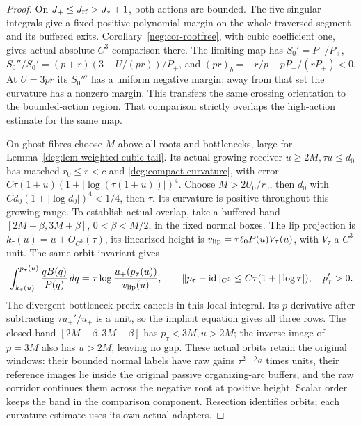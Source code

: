 \begin{proof}
On \(J_+\le J_{\rm rf}>J_*+1\),
both actions are bounded. The five singular integrals give a fixed
positive polynomial margin on the whole traversed segment and its
buffered exits. Corollary~\ref{neg:cor-rootfree}, with cubic coefficient
one, gives actual absolute \(C^3\) comparison there. The limiting map has
\(S_0'=P_-/P_+\),
\(S_0''/S_0'=(p+r)(3-U/(pr))/P_+\), and
\((pr)_b=-r/p-pP_-/(rP_+)<0\).
At \(U=3pr\) its \(S_0'''\) has a uniform negative margin; away
from that set the curvature has a nonzero margin. This transfers the
same crossing orientation to the bounded-action region. That comparison
strictly overlaps the high-action estimate for the same map.

On ghost fibres choose \(M\) above all roots and bottlenecks, large
for Lemma~\ref{deg:lem-weighted-cubic-tail}. Its actual growing
receiver \(u\ge2M,\tau u\le d_0\) has matched \(r_0\le r<c\)
and \eqref{deg:compact-curvature}, with error
\(C\tau(1+u)(1+|\log(\tau(1+u))|)^4\). Choose
\(M>2U_0/r_0\), then \(d_0\) with
\(Cd_0(1+|\log d_0|)^4<1/4\), then \(\tau\). Its curvature is
positive throughout this growing range.
To establish actual overlap, take a buffered band
\([2M-\beta,3M+\beta]\), \(0<\beta<M/2\), in the fixed normal
boxes. The lip projection is \(k_\tau(u)=u+O_{C^3}(\tau)\),
its linearized height is \(v_{\rm lip}=\tau\ell_0P(u)V_\tau(u)\),
with \(V_\tau\) a \(C^3\) unit. The same-orbit invariant gives
\begin{equation}\label{deg:compact-resection}
 \int_{k_\tau(u)}^{p_\tau(u)}\frac{qB(q)}{P(q)}\,dq
 =\tau\log\frac{u_+(p_\tau(u))}{v_{\rm lip}(u)},\qquad
 \|p_\tau-\mathrm{id}\|_{C^3}\le C\tau(1+|\log\tau|),\quad p_\tau'>0.
\end{equation}
The divergent bottleneck prefix cancels in this local integral. Its
\(p\)-derivative after subtracting \(\tau u_+'/u_+\) is a unit,
so the implicit equation gives all three rows. The closed band
\([2M+\beta,3M-\beta]\) has \(p_\tau<3M,u>2M\); the inverse
image of \(p=3M\) also has \(u>2M\), leaving no gap. These actual
orbits retain the original windows: their bounded normal labels have
raw gains \(\tau^{2-\lambda_G}\) times units, their reference images
lie inside the original passive organizing-arc buffers, and the raw
corridor continues them across the negative root at positive height.
Scalar order keeps the band in the comparison component. Resection
identifies orbits; each curvature estimate uses its own actual adapters.


\end{proof}
